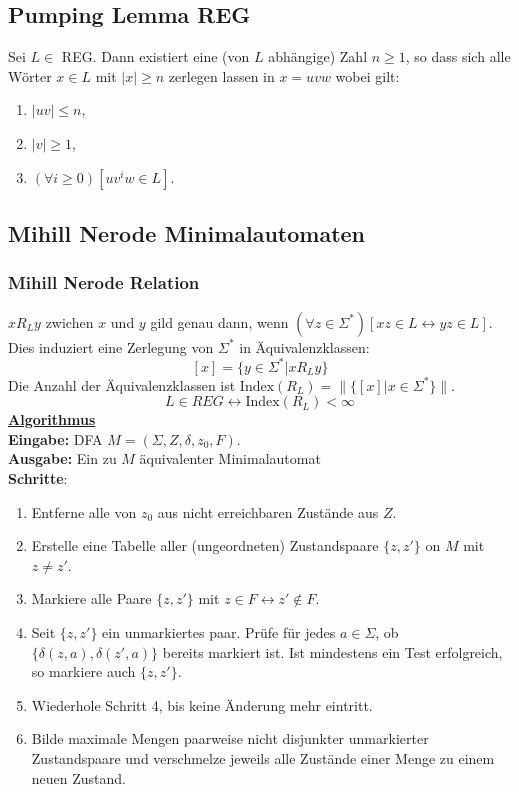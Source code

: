\documentclass[9pt]{article}
\begin{document}
\subsection{Pumping Lemma REG}
Sei $L \in$ REG. Dann existiert eine (von $L$ abhängige) Zahl $n \geq 1$, so dass sich alle Wörter $x \in L$ mit $|x|\geq n$ zerlegen lassen in $x = uvw$ wobei gilt:
\begin{enumerate}
	\item $|uv| \leq n$,
	\item $|v| \geq 1$,
	\item $(\forall i \geq 0)[uv^iw \in L]$.
\end{enumerate}
\subsection{Mihill Nerode Minimalautomaten}
\subsubsection{Mihill Nerode Relation}
$xR_Ly$ zwichen $x$ und $y$ gild genau dann, wenn $(\forall z \in \Sigma^*)[xz\in L \leftrightarrow yz \in L]$.
Dies induziert eine Zerlegung von $\Sigma^*$ in Äquivalenzklassen: $$[x] = \{y \in \Sigma^* | xR_Ly\}$$
Die Anzahl der Äquivalenzklassen ist $\text{Index}(R_L) = \|\{[x]|x \in \Sigma^*\}\|$.
$$L\in REG \leftrightarrow \text{Index}(R_L) < \infty$$
\textbf{\underline{Algorithmus}}\\
\textbf{Eingabe:} DFA $M = (\Sigma, Z, \delta, z_0, F)$.\\
\textbf{Ausgabe:} Ein zu $M$ äquivalenter Minimalautomat\\
\textbf{Schritte}:
\begin{enumerate}
	\item Entferne alle von $z_0$ aus nicht erreichbaren Zustände aus $Z$.
	\item Erstelle eine Tabelle aller (ungeordneten) Zustandspaare $\{z, z'\}$ on $M$ mit $z \neq z'$.
	\item Markiere alle Paare $\{z, z'\}$ mit
	$z\in F \leftrightarrow z' \notin F$.
	\item Seit $\{z, z'\}$ ein unmarkiertes paar. Prüfe für jedes $a \in \Sigma$, ob
	$\{\delta(z, a), \delta(z', a)\}$
	bereits markiert ist. Ist mindestens ein Test erfolgreich, so markiere auch $\{z, z'\}$.
	\item Wiederhole Schritt 4, bis keine Änderung mehr eintritt.
	\item Bilde maximale Mengen paarweise nicht disjunkter unmarkierter Zustandspaare und verschmelze jeweils alle Zustände einer Menge zu einem neuen Zustand.
\end{enumerate}
\end{document}
